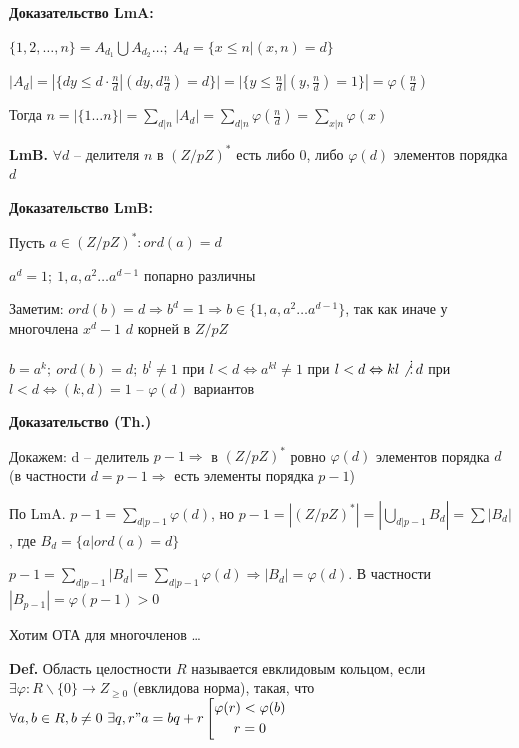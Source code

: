 \documentclass[14pt, letter paper]{article}
\begin{document}
\textbf{Доказательство LmA:}

$\{ 1, 2, \ldots, n\} = A_{d_1} \bigcup A_{d_2} \ldots;\ A_d = \{ x \leq n | (x, n) = d \}$

$|A_d| = |\{ dy \leq d \cdot \frac{n}{d} | (dy, d\frac{n}{d}) = d \}| = |\{y \leq \frac{n}{d} | (y, \frac{n}{d}) = 1\}| = \varphi(\frac{n}{d})$

Тогда $n = |\{1 \ldots n\}| = \sum\limits_{d | n} |A_d| = \sum\limits_{d | n} \varphi(\frac{n}{d}) = \sum\limits_{x | n} \varphi(x)$

\vspace{2mm}

\textbf{LmB.} $\forall d$ -- делителя $n$ в $(Z/pZ)^*$ есть либо 0, либо $\varphi(d)$ элементов порядка $d$

\textbf{Доказательство LmB:}

Пусть $a \in (Z/pZ)^* : ord(a) = d$

$a^d = 1;\ 1, a, a^2 \ldots a^{d-1}$ попарно различны

Заметим: $ord(b) = d \Rightarrow b^d = 1 \Rightarrow b \in \{1, a, a^2 \ldots a^{d-1}\}$, так как иначе у многочлена $x^d - 1$ $d$ корней в $Z/pZ$

$b = a^k;\ ord(b) = d;\ b^l \neq 1$ при $l < d \Leftrightarrow a^{kl} \neq 1$ при $l < d \Leftrightarrow kl \not \, \vdots \, d$ при $l < d \Leftrightarrow (k, d) = 1$ -- $\varphi(d)$ вариантов

\vspace{2mm}

\begin{center}
    \textbf{Доказательство (Th.)}
\end{center}

Докажем: d -- делитель $p-1 \Rightarrow$ в $(Z/pZ)^*$ ровно $\varphi(d)$ элементов порядка $d$ (в частности $d = p - 1 \Rightarrow$ есть элементы порядка $p - 1$)

По LmA. $p-1 = \sum\limits_{d | p-1} \varphi(d)$, но $p - 1 = |(Z/pZ)^*| = |\bigcup\limits_{d | p-1} B_d| = \sum |B_d|$, где $B_d = \{a | ord(a) = d\}$

$p - 1 = \sum\limits_{d | p - 1} |B_d| = \sum\limits_{d | p - 1} \varphi(d) \Rightarrow |B_d| = \varphi(d)$. В частности $|B_{p-1}| = \varphi(p-1) > 0$

\vspace{5mm}

Хотим ОТА для многочленов \ldots

\textbf{Def.} Область целостности $R$ называется евклидовым кольцом, если $\exists \varphi : R\backslash\{0\} \rightarrow Z_{\geq 0}$ (евклидова норма), такая, что $\forall a, b \in R, b \neq 0\ \exists q, r " a = bq + r \left[ \begin{gathered}
    \varphi(r) < \varphi(b) \\
    r = 0
\end{gathered} \right.$
\end{document}
